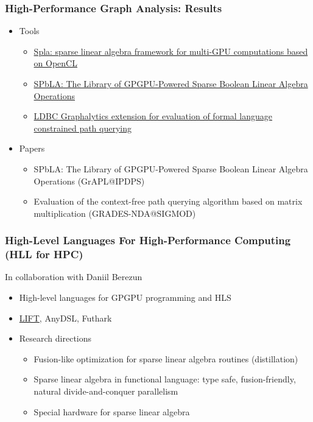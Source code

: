 \documentclass[xcolor=table,aspectratio=169]{beamer}
\begin{document}
\begin{frame}[fragile]
  \frametitle{High-Performance Graph Analysis: Results}
    \begin{itemize}
      \item Tools
      \begin{itemize}
        \item \href{https://github.com/JetBrains-Research/spla}{Spla: sparse linear algebra framework for multi-GPU computations based on OpenCL}
        \item \href{https://ieeexplore.ieee.org/abstract/document/9460674}{SPbLA: The Library of GPGPU-Powered Sparse Boolean Linear Algebra Operations}    
        \item \href{https://github.com/JetBrains-Research/ldbc_graphalytics}{LDBC Graphalytics extension for evaluation of formal language constrained path querying}    
      \end{itemize}
      \item Papers 
      \begin{itemize}
        \item SPbLA: The Library of GPGPU-Powered Sparse Boolean Linear Algebra Operations (GrAPL@IPDPS)
        \item Evaluation of the context-free path querying algorithm based on matrix multiplication (GRADES-NDA@SIGMOD)
      \end{itemize} 
    \end{itemize}
\end{frame}

\begin{frame}[fragile]
  \frametitle{High-Level Languages For High-Performance Computing (HLL for HPC)}
  In collaboration with Daniil Berezun
  \begin{itemize}    
  \item High-level languages for GPGPU programming and HLS
  \item \href{https://www.lift-project.org/}{LIFT}, AnyDSL, Futhark
  \pause
  \item Research directions
  \begin{itemize}
    \item Fusion-like optimization for sparse linear algebra routines (distillation)
    \item Sparse linear algebra in functional language: type safe, fusion-friendly, natural divide-and-conquer parallelism
    \item Special hardware for sparse linear algebra
  \end{itemize}
  \end{itemize}
\end{frame}
\end{document}
